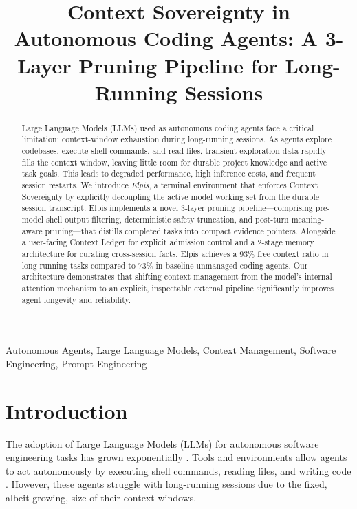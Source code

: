 \documentclass[conference]{IEEEtran}
\begin{document}
\title{Context Sovereignty in Autonomous Coding Agents: A 3-Layer Pruning Pipeline for Long-Running Sessions}

\author{
}

\maketitle

\begin{abstract}
Large Language Models (LLMs) used as autonomous coding agents face a critical limitation: context-window exhaustion during long-running sessions. As agents explore codebases, execute shell commands, and read files, transient exploration data rapidly fills the context window, leaving little room for durable project knowledge and active task goals. This leads to degraded performance, high inference costs, and frequent session restarts. We introduce \textit{Elpis}, a terminal environment that enforces Context Sovereignty by explicitly decoupling the active model working set from the durable session transcript. Elpis implements a novel 3-layer pruning pipeline---comprising pre-model shell output filtering, deterministic safety truncation, and post-turn meaning-aware pruning---that distills completed tasks into compact evidence pointers. Alongside a user-facing Context Ledger for explicit admission control and a 2-stage memory architecture for curating cross-session facts, Elpis achieves a 93\% free context ratio in long-running tasks compared to 73\% in baseline unmanaged coding agents. Our architecture demonstrates that shifting context management from the model's internal attention mechanism to an explicit, inspectable external pipeline significantly improves agent longevity and reliability.
\end{abstract}

\begin{IEEEkeywords}
Autonomous Agents, Large Language Models, Context Management, Software Engineering, Prompt Engineering
\end{IEEEkeywords}

\section{Introduction}
The adoption of Large Language Models (LLMs) for autonomous software engineering tasks has grown exponentially \cite{bubeck2023sparks}. Tools and environments allow agents to act autonomously by executing shell commands, reading files, and writing code \cite{tian2023chatgpt}. However, these agents struggle with long-running sessions due to the fixed, albeit growing, size of their context windows.
\end{document}
